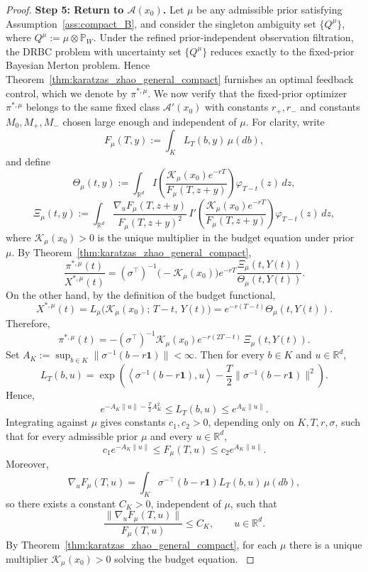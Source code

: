 \documentclass[11pt]{article}
\theoremstyle{definition}
\begin{document}
\begin{proof}
\textbf{Step 5: Return to $\mathcal{A}(x_0)$.}
{Let $\mu$ be any admissible prior satisfying Assumption~\ref{ass:compact_B}, and consider the
singleton ambiguity set $\{{Q}^\mu\}$, where ${Q}^\mu:=\mu\otimes \mathbb{P}_W.$
Under the refined prior-independent observation filtration, the DRBC problem with uncertainty set
$\{{Q}^\mu\}$ reduces exactly to the fixed-prior Bayesian Merton problem. Hence
Theorem~\ref{thm:karatzas_zhao_general_compact} furnishes an optimal feedback control, which we denote by $\pi^{*,\mu}$. We now verify that the fixed-prior optimizer $\pi^{*,\mu}$ belongs to the same fixed class $\mathcal{A}'(x_0)$ with {constants $r_+,r_-$ and constants \(M_0,M_+,M_-\) chosen large enough and independent of $\mu$. }
For clarity, write
\[
F_\mu(T,y):=\int_K L_T(b,y)\,\mu(db),
\]
and define
\[
\Theta_\mu(t,y):=\int_{\mathbb{R}^d}
I\!\left(\frac{\mathcal{K}_\mu(x_0)e^{-rT}}{F_\mu(T,z+y)}\right)\varphi_{T-t}(z)\,dz,
\]
\[
\Xi_\mu(t,y):=\int_{\mathbb{R}^d}
\frac{\nabla_u F_\mu(T,z+y)}{F_\mu(T,z+y)^2}
\,I'\!\left(\frac{\mathcal{K}_\mu(x_0)e^{-rT}}{F_\mu(T,z+y)}\right)\varphi_{T-t}(z)\,dz,
\]
where $\mathcal{K}_\mu(x_0)>0$ is the unique multiplier in the budget equation under prior $\mu$.
By Theorem~\ref{thm:karatzas_zhao_general_compact},
\[
\frac{\pi^{*,\mu}(t)}{X^{*,\mu}(t)}
=
(\sigma^\top)^{-1}\bigl(-\mathcal{K}_\mu(x_0)\bigr)e^{-rT}
\frac{\Xi_\mu(t,Y(t))}{\Theta_\mu(t,Y(t))}.
\]
On the other hand, by the definition of the budget functional,
\[
X^{*,\mu}(t)
=
L_\mu\!\bigl(\mathcal{K}_\mu(x_0);\,T-t,\,Y(t)\bigr)
=
e^{-r(T-t)}\Theta_\mu(t,Y(t)).
\]
Therefore, 
\[
\pi^{*,\mu}(t)
=
-(\sigma^\top)^{-1}\mathcal{K}_\mu(x_0)e^{-r(2T-t)}\,\Xi_\mu(t,Y(t)).
\]
Set $A_K:=\sup_{b\in K}\|\sigma^{-1}(b-r\mathbf{1})\|<\infty$. 
Then for every $b\in K$ and $u\in\mathbb{R}^d$,
\[
L_T(b,u)
=
\exp\!\left(
\left\langle \sigma^{-1}(b-r\mathbf{1}),u\right\rangle
-\frac{T}{2}\|\sigma^{-1}(b-r\mathbf{1})\|^2
\right). 
\]
Hence, 
\[
e^{-A_K\|u\|-\frac{T}{2}A_K^2}
\le
L_T(b,u)
\le
e^{A_K\|u\|}.
\]
Integrating against $\mu$ gives constants $c_1,c_2>0$, depending only on
$K,T,r,\sigma$, such that for every admissible prior $\mu$ and every $u\in\mathbb{R}^d$,
\[
c_1 e^{-A_K\|u\|}
\le
F_\mu(T,u)
\le
c_2 e^{A_K\|u\|}.
\]
Moreover,
\[
\nabla_u F_\mu(T,u)
=
\int_K \sigma^{-\top}(b-r\mathbf{1})L_T(b,u)\,\mu(db),
\]
so there exists a constant $C_K>0$, independent of $\mu$, such that
\[
\frac{\|\nabla_u F_\mu(T,u)\|}{F_\mu(T,u)}\le C_K,
\qquad u\in\mathbb{R}^d.
\]
By Theorem~\ref{thm:karatzas_zhao_general_compact}, for each $\mu$ there is a unique multiplier $\mathcal{K}_\mu(x_0)>0$ solving the budget equation.
}
\end{proof}
\end{document}
